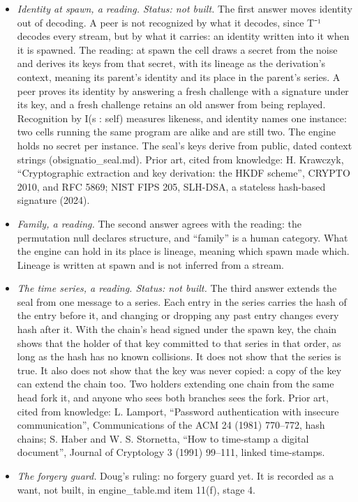 \begin{itemize}
\item \emph{Identity at spawn, a reading. Status: not built.} The first answer moves identity out of decoding. A peer is not recognized by what it decodes, since T⁻¹ decodes every stream, but by what it carries: an identity written into it when it is spawned. The reading: at spawn the cell draws a secret from the noise and derives its keys from that secret, with its lineage as the derivation's context, meaning its parent's identity and its place in the parent's series. A peer proves its identity by answering a fresh challenge with a signature under its key, and a fresh challenge retains an old answer from being replayed. Recognition by I(s : self) measures likeness, and identity names one instance: two cells running the same program are alike and are still two. The engine holds no secret per instance. The seal's keys derive from public, dated context strings (obsignatio\_\allowbreak{}seal.md). Prior art, cited from knowledge: H. Krawczyk, “Cryptographic extraction and key derivation: the HKDF scheme”, CRYPTO 2010, and RFC 5869; NIST FIPS 205, SLH-DSA, a stateless hash-based signature (2024).
\item \emph{Family, a reading.} The second answer agrees with the reading: the permutation null declares structure, and “family” is a human category. What the engine can hold in its place is lineage, meaning which spawn made which. Lineage is written at spawn and is not inferred from a stream.
\item \emph{The time series, a reading. Status: not built.} The third answer extends the seal from one message to a series. Each entry in the series carries the hash of the entry before it, and changing or dropping any past entry changes every hash after it. With the chain's head signed under the spawn key, the chain shows that the holder of that key committed to that series in that order, as long as the hash has no known collisions. It does not show that the series is true. It also does not show that the key was never copied: a copy of the key can extend the chain too. Two holders extending one chain from the same head fork it, and anyone who sees both branches sees the fork. Prior art, cited from knowledge: L. Lamport, “Password authentication with insecure communication”, Communications of the ACM 24 (1981) 770–772, hash chains; S. Haber and W. S. Stornetta, “How to time-stamp a digital document”, Journal of Cryptology 3 (1991) 99–111, linked time-stamps.
\item \emph{The forgery guard.} Doug's ruling: no forgery guard yet. It is recorded as a want, not built, in engine\_\allowbreak{}table.md item 11(f), stage 4.
\end{itemize}
